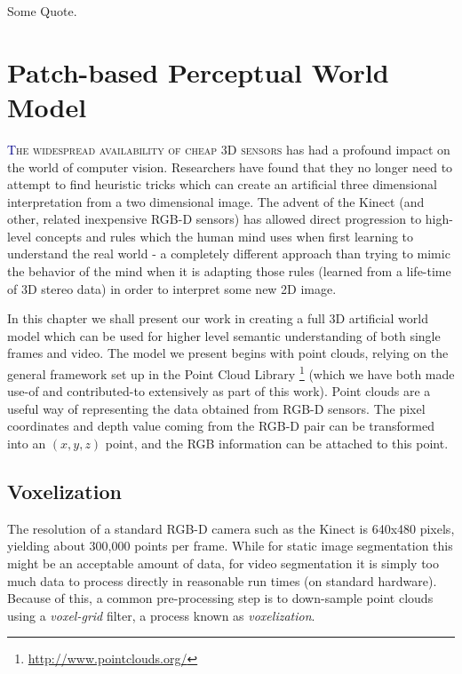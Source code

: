 \begin{savequote}[75mm]
Some Quote.
\end{savequote}


\chapter{Patch-based Perceptual World Model}
\label{Chap:WorldModel}
\lettrine[lines=3, loversize=0.3]{\textcolor{DarkBlue}T}{he widespread availability of cheap 3D sensors} has had a profound impact on the world of computer vision. Researchers have found that they no longer need to attempt to find heuristic tricks which can create an artificial three dimensional interpretation from a two dimensional image. The advent of the Kinect (and other, related inexpensive RGB-D sensors) has allowed direct progression to high-level concepts and rules which the human mind uses when first learning to understand the real world - a completely different approach than trying to mimic the behavior of the mind when it is adapting those rules (learned from a life-time of 3D stereo data) in order to interpret some new 2D image.

In this chapter we shall present our work in creating a full 3D artificial world model which can be used for higher level semantic understanding of both single frames and video. The model we present begins with point clouds, relying on the general framework set up in the Point Cloud Library \footnote{\url{http://www.pointclouds.org/}} (which we have both made use-of and contributed-to extensively as part of this work). Point clouds are a useful way of representing the data obtained from RGB-D sensors. The pixel coordinates and depth value coming from the RGB-D pair can be transformed into an $(x,y,z)$ point, and the RGB information can be attached to this point.

\section{Voxelization}
The resolution of a standard RGB-D camera such as the Kinect is 640x480 pixels, yielding about 300,000 points per frame. While for static image segmentation this might be an acceptable amount of data, for video segmentation it is simply too much data to process directly in reasonable run times (on standard hardware). Because of this, a common pre-processing step is to down-sample point clouds using a \textit{voxel-grid} filter, a process known as \textit{voxelization}. 

